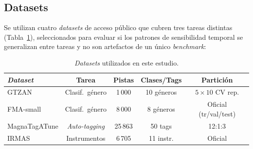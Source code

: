 \documentclass[conference]{IEEEtran}
\begin{document}


\subsection{Datasets}
Se utilizan cuatro \textit{datasets} de acceso público que cubren tres tareas distintas (Tabla~\ref{tab:datasets}), seleccionados para evaluar si los patrones de sensibilidad temporal se generalizan entre tareas y no son artefactos de un único \textit{benchmark}:

\begin{table}[htp]
\centering
\caption{\textit{Datasets} utilizados en este estudio.}
\label{tab:datasets}
\begin{tabular}{@{}lcccc@{}}
\toprule
\textbf{\textit{Dataset}} & \textbf{Tarea} & \textbf{Pistas} & 
\textbf{Clases/Tags} & \textbf{Partición} \\
\midrule
GTZAN \cite{tzanetakis2002musical} & Clasif.\ género & 1\,000 &
    10 géneros & $5{\times}10$ CV rep. \\
FMA-small \cite{defferrard2017fma} & Clasif.\ género & 8\,000 &
    8 géneros  & Oficial (tr/val/test) \\
MagnaTagATune \cite{law2009evaluation} & \textit{Auto-tagging} & 25\,863 & 
    50 tags    & 12:1:3 \\
IRMAS \cite{bosch2012comparison} & 
    Instrumentos & 
    6\,705 & 11 instr. & 
    Oficial \\
\bottomrule
\end{tabular}
\end{table}
\end{document}
